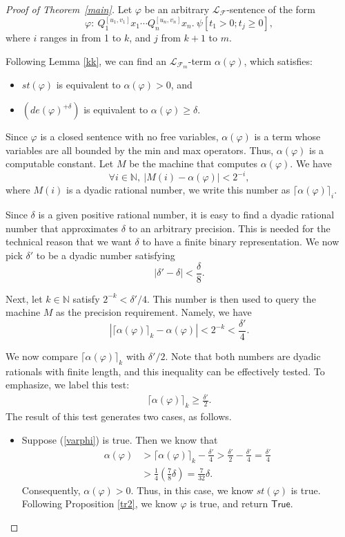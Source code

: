 \documentclass[conference]{IEEEtran}
\begin{document}
\begin{proof}[Proof of Theorem~\ref{main}] Let $\varphi$ be an arbitrary $\mathcal{L}_{\mathcal{F}}$-sentence of the form
$$\varphi:\ Q_1^{[u_1,v_1]}x_1\cdots Q_n^{[u_n,v_n]}x_n.\ \psi[t_1>0;t_j\geq 0],$$
where $i$ ranges in from 1 to  $k$, and $j$ from $k+1$ to $m$. 

Following Lemma \ref{kk}, we can find an $\mathcal{L}_{\mathcal{F}_m}$-term $\alpha(\varphi)$, which satisfies: 
\begin{itemize}
\item $\mathit{st}(\varphi)$ is equivalent to $\alpha(\varphi)>0$, and
\item $(de(\varphi)^{+\delta})$ is equivalent to $\alpha(\varphi)\geq \delta$. 
\end{itemize}
Since $\varphi$ is a closed sentence with no free variables, $\alpha(\varphi)$ is a term whose variables are all bounded by the min and max operators. Thus, $\alpha(\varphi)$ is a computable constant. Let $M$ be the machine that computes $\alpha(\varphi)$. We have
$$\forall i\in \mathbb{N},\ |M(i)-\alpha(\varphi)|<2^{-i},$$
where $M(i)$ is a dyadic rational number, we write this number as $\lceil \alpha(\varphi)\rceil_i$. 

Since $\delta$ is a given positive rational number, it is easy to find a dyadic rational number that approximates $\delta$ to an arbitrary precision. This is needed for the technical reason that we want $\delta$ to have a finite binary representation. We now pick $\delta'$ to be a dyadic number satisfying
$$|\delta'-\delta|<\frac{\delta}{8}.$$

Next, let $k\in \mathbb{N}$ satisfy $2^{-k}<\delta'/4$. This number is then used to query the machine $M$ as the precision requirement. Namely, we have
$$|\lceil \alpha(\varphi)\rceil_k - \alpha(\varphi)|<2^{-k}<\frac{\delta'}{4}.$$

We now compare $\lceil \alpha(\varphi)\rceil_k$ with $\delta'/2$. Note that both numbers are dyadic rationals with finite length, and this inequality can be effectively tested. To emphasize, we label this test:
\begin{eqnarray}\label{varphi}
\lceil \alpha(\varphi)\rceil_k \geq \frac{\delta'}{2}.
\end{eqnarray}
The result of this test generates two cases, as follows. 
\begin{itemize}
\item Suppose (\ref{varphi}) is true. Then we know that 
\begin{align*}
\alpha(\varphi)&>\lceil\alpha(\varphi)\rceil_k - \frac{\delta'}{4}  >\frac{\delta'}{2} -\frac{\delta'}{4} = \frac{\delta'}{4}\\
& >\frac{1}{4}(\frac{7}{8}\delta) = \frac{7}{32}\delta. 
\end{align*}
Consequently, $\alpha(\varphi)>0$. Thus, in this case, we know $st(\varphi)$ is true. Following Proposition \ref{tr2}, we know $\varphi$ is true, and return $\mathsf{True}$.


\end{itemize}
\end{proof}
\end{document}
